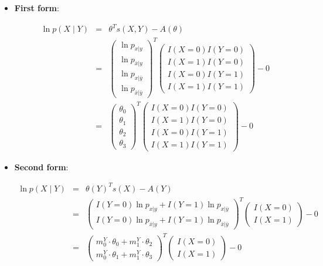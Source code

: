 \documentclass[11pt, oneside]{article}   	%
\numberwithin{figure}{section}
\numberwithin{equation}{section}
\numberwithin{table}{section}
\begin{document}
\begin{itemize}

\item \textbf{First form}:

\begin{eqnarray*}
\ln p(X \mid Y) &=& \theta^T s(X,Y) - A(\theta) \\
&=&
\begin{pmatrix}
\ln p_{x|y}\\
\ln p_{\bar{x}|y}\\
\ln p_{x|\bar{y}}\\
\ln p_{\bar{x}|\bar{y}}
\end{pmatrix}^T
\begin{pmatrix}
I(X=0)I(Y=0) \\
I(X=1)I(Y=0) \\
I(X=0)I(Y=1) \\
I(X=1)I(Y=1) 
\end{pmatrix}
- 0\\
&=&
\begin{pmatrix}
\theta_0\\
\theta_1\\
\theta_2\\
\theta_3
\end{pmatrix}^T
\begin{pmatrix}
I(X=0)I(Y=0) \\
I(X=1)I(Y=0) \\
I(X=0)I(Y=1) \\
I(X=1)I(Y=1) 
\end{pmatrix}
- 0
\end{eqnarray*}

\item \textbf{Second form}:

\begin{eqnarray*}
\ln p(X \mid Y) &=& \theta(Y)^Ts(X) - A(Y) \\
&=&
\begin{pmatrix}
I(Y=0)\ln p_{x|y}  + I(Y=1)\ln p_{x|\bar{y}}\\
I(Y=0)\ln p_{\bar{x}|y}  + I(Y=1)\ln p_{\bar{x}|\bar{y}}
\end{pmatrix}^T
\begin{pmatrix}
I(X=0) \\
I(X=1)
\end{pmatrix}
- 0 \\
&=&
\begin{pmatrix}
m^Y_0\cdot\theta_0  + m^Y_1\cdot\theta_2\\
m^Y_0\cdot\theta_1  + m^Y_1\cdot\theta_3
\end{pmatrix}^T
\begin{pmatrix}
I(X=0) \\
I(X=1)
\end{pmatrix}
- 0 
\end{eqnarray*}


\end{itemize}
\end{document}
